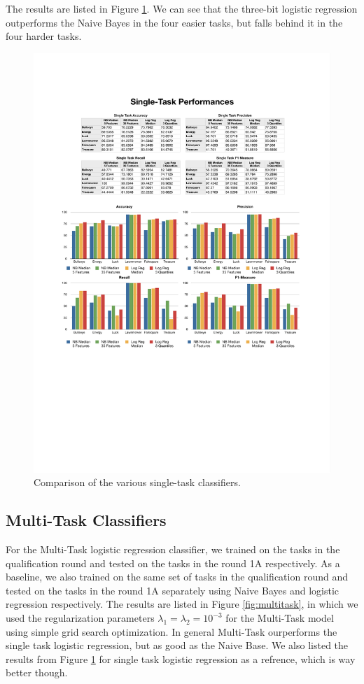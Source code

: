 The results are listed in Figure \ref{fig:singletask}. We can see that the three-bit logistic regression outperforms the Naive Bayes in the four easier tasks, but falls behind it in the four harder tasks.

%
\begin{figure}
    \centering
    \setlength{\tabcolsep}{0.0130\linewidth}
    \includegraphics[width=\linewidth]{figures/SingleTask}
    \caption{Comparison of the various single-task classifiers.%
      \label{fig:singletask}}
\end{figure}


\subsection{Multi-Task Classifiers}
For the Multi-Task logistic regression classifier, we trained on the tasks in the qualification round and tested on the tasks in the round 1A respectively. As a baseline, we also trained on the same set of tasks in the qualification round and tested on the tasks in the round 1A separately using Naive Bayes and logistic regression respectively. The results are listed in Figure \ref{fig:multitask}, in which we used the regularization parameters $\lambda_1 = \lambda_2 = 10^{-3}$ for the Multi-Task model using simple grid search optimization. In general Multi-Task ourperforms the single task logistic regression, but as good as the Naive Base. We also listed the results from Figure \ref{fig:singletask} for single task logistic regression as a refrence, which is way better though.  

